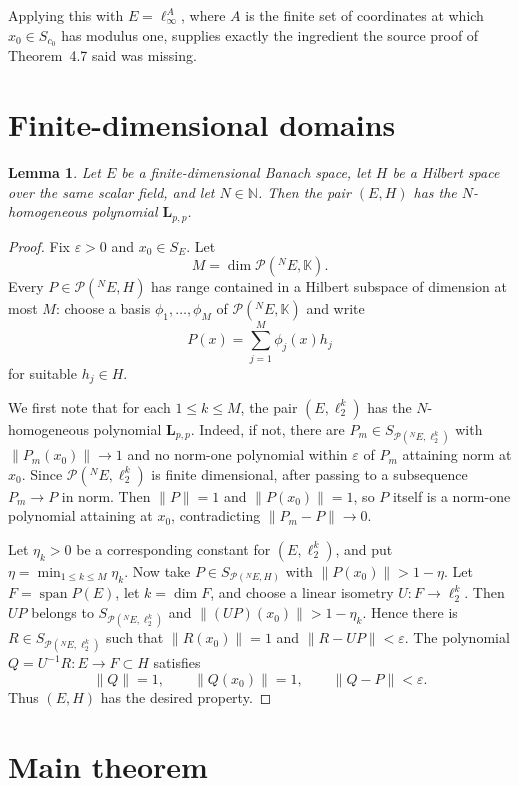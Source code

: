 \documentclass[11pt]{article}
\newtheorem{lemma}{Lemma}
\newcommand{\K}{\mathbb K}
\newcommand{\N}{\mathbb N}
\newcommand{\cP}{\mathcal P}
\newcommand{\Lpp}{\mathbf L_{p,p}}
\begin{document}
Applying this with \(E=\ell_\infty^A\), where \(A\) is the finite set of
coordinates at which \(x_0\in S_{c_0}\) has modulus one, supplies exactly the
ingredient the source proof of Theorem~4.7 said was missing.

\section*{Finite-dimensional domains}

\begin{lemma}\label{lem:finite-domain-hilbert}
Let \(E\) be a finite-dimensional Banach space, let \(H\) be a Hilbert space
over the same scalar field, and let \(N\in\N\).  Then the pair \((E,H)\) has
the \(N\)-homogeneous polynomial \(\Lpp\).
\end{lemma}

\begin{proof}
Fix \(\varepsilon>0\) and \(x_0\in S_E\).  Let
\[
  M=\dim \cP(^N E,\K).
\]
Every \(P\in\cP(^N E,H)\) has range contained in a Hilbert subspace of
dimension at most \(M\): choose a basis \(\phi_1,\ldots,\phi_M\) of
\(\cP(^N E,\K)\) and write
\[
  P(x)=\sum_{j=1}^M \phi_j(x)h_j
\]
for suitable \(h_j\in H\).

We first note that for each \(1\le k\le M\), the pair \((E,\ell_2^k)\) has the
\(N\)-homogeneous polynomial \(\Lpp\).  Indeed, if not, there are
\(P_m\in S_{\cP(^N E,\ell_2^k)}\) with \(\|P_m(x_0)\|\to1\) and no
norm-one polynomial within \(\varepsilon\) of \(P_m\) attaining norm at
\(x_0\).  Since \(\cP(^N E,\ell_2^k)\) is finite dimensional, after passing to
a subsequence \(P_m\to P\) in norm.  Then \(\|P\|=1\) and
\(\|P(x_0)\|=1\), so \(P\) itself is a norm-one polynomial attaining at
\(x_0\), contradicting \(\|P_m-P\|\to0\).

Let \(\eta_k>0\) be a corresponding constant for \((E,\ell_2^k)\), and put
\(\eta=\min_{1\le k\le M}\eta_k\).  Now take \(P\in S_{\cP(^N E,H)}\) with
\(\|P(x_0)\|>1-\eta\).  Let \(F=\operatorname{span}P(E)\), let \(k=\dim F\),
and choose a linear isometry \(U:F\to\ell_2^k\).  Then \(UP\) belongs to
\(S_{\cP(^N E,\ell_2^k)}\) and \(\|(UP)(x_0)\|>1-\eta_k\).  Hence there is
\(R\in S_{\cP(^N E,\ell_2^k)}\) such that \(\|R(x_0)\|=1\) and
\(\|R-UP\|<\varepsilon\).  The polynomial \(Q=U^{-1}R:E\to F\subset H\)
satisfies
\[
  \|Q\|=1,\qquad \|Q(x_0)\|=1,\qquad \|Q-P\|<\varepsilon .
\]
Thus \((E,H)\) has the desired property.
\end{proof}

\section*{Main theorem}
\end{document}
